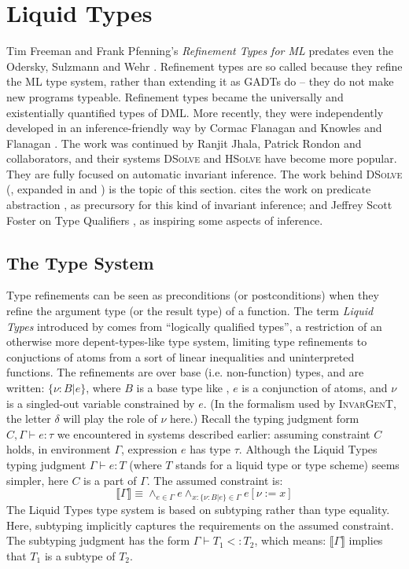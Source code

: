 \documentclass{article}
\newcommand{\assign}{:=}
\newcommand{\tmem}[1]{{\em #1\/}}
\newcommand{\tmname}[1]{\textsc{#1}}
\newcommand{\tmverbatim}[1]{{\ttfamily{#1}}}
\begin{document}
\section{Liquid Types}\label{LiquidSection}

Tim Freeman and Frank Pfenning's {\tmem{Refinement Types for ML}}
{\cite{RefinementFreemanPfenning}} predates even the Odersky, Sulzmann and
Wehr {\cite{HMX}}. Refinement types are so called because they refine the ML
type system, rather than extending it as GADTs do -- they do not make new
programs typeable. Refinement types became the universally and existentially
quantified types of DML. More recently, they were independently developed in
an inference-friendly way by Cormac Flanagan {\cite{Flanagan06}} and Knowles
and Flanagan {\cite{KnowlesF07}}. The work was continued by Ranjit Jhala,
Patrick Rondon and collaborators, and their systems {\tmname{DSolve}}
{\cite{DSolvePaper}} and {\tmname{HSolve}} {\cite{AbstractLiquid}} have become
more popular. They are fully focused on automatic invariant inference. The
work behind {\tmname{DSolve}} ({\cite{DSolvePaper}}, expanded in
{\cite{DSolveTechRep}} and {\cite{DSolveThesis}}) is the topic of this
section. {\cite{DSolvePaper}} cites the work on predicate abstraction
{\cite{AssertionGraphs}}, {\cite{AbstractStateGraphs}} as precursory for this
kind of invariant inference; and Jeffrey Scott Foster on Type Qualifiers
{\cite{TypeQualifiers}}, as inspiring some aspects of inference.

\subsection{The Type System}

Type refinements can be seen as preconditions (or postconditions) when they
refine the argument type (or the result type) of a function. The term
{\tmem{Liquid Types}} introduced by {\cite{DSolvePaper}} comes from
``logically qualified types'', a restriction of an otherwise more
depent-types-like type system, limiting type refinements to conjuctions of
atoms from a sort of linear inequalities and uninterpreted functions. The
refinements are over base (i.e. non-function) types, and are written: $\{ \nu
: B | e \}$, where $B$ is a base type like \tmverbatim{int}, $e$ is a
conjunction of atoms, and $\nu$ is a singled-out variable constrained by $e$.
(In the formalism used by {\tmname{InvarGenT}}, the letter $\delta$ will play
the role of $\nu$ here.) Recall the typing judgment form $C, \Gamma \vdash e :
\tau$ we encountered in systems described earlier: assuming constraint $C$
holds, in environment $\Gamma$, expression $e$ has type $\tau$. Although the
Liquid Types typing judgment $\Gamma \vdash e : T$ (where $T$ stands for a
liquid type or type scheme) seems simpler, here $C$ is a part of $\Gamma$. The
assumed constraint is:
\[ \llbracket \Gamma \rrbracket \equiv \wedge_{e \in \Gamma} e \wedge_{x : \{
   \nu : B | e \} \in \Gamma} e [\nu \assign x] \]
The Liquid Types type system is based on subtyping rather than type equality.
Here, subtyping implicitly captures the requirements on the assumed
constraint. The subtyping judgment has the form $\Gamma \vdash T_1 < : T_2$,
which means: $\llbracket \Gamma \rrbracket$ implies that $T_1$ is a subtype of
$T_2$.
\end{document}
